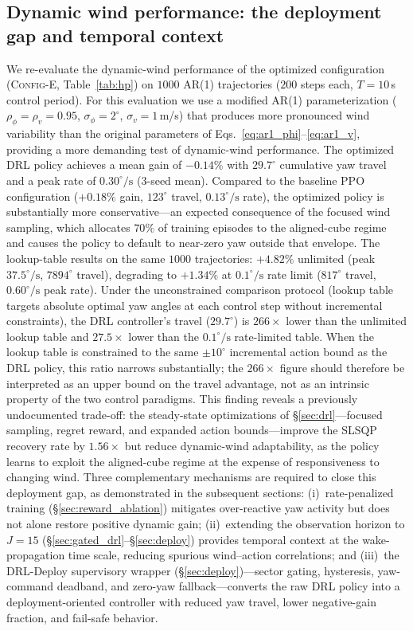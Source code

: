 \documentclass[final,5p,times]{elsarticle}
\begin{document}
\subsection{Dynamic wind performance: the deployment gap and temporal context}\label{sec:dynamic_wind}

We re-evaluate the dynamic-wind performance of the optimized configuration (\textsc{Config-E}, Table~\ref{tab:hp}) on $1000$ AR(1) trajectories ($200$ steps each, $T{=}10$\,s control period). For this evaluation we use a modified AR(1) parameterization ($\rho_\phi{=}\rho_v{=}0.95$, $\sigma_\phi{=}2^\circ$, $\sigma_v{=}1$\,m/s) that produces more pronounced wind variability than the original parameters of Eqs.~\eqref{eq:ar1_phi}--\eqref{eq:ar1_v}, providing a more demanding test of dynamic-wind performance. The optimized DRL policy achieves a mean gain of $-0.14\%$ with $29.7^\circ$ cumulative yaw travel and a peak rate of $0.30^\circ\!/\!\mathrm{s}$ (3-seed mean). Compared to the baseline PPO configuration ($+0.18\%$ gain, $123^\circ$ travel, $0.13^\circ\!/\!\mathrm{s}$ rate), the optimized policy is substantially more conservative---an expected consequence of the focused wind sampling, which allocates $70\%$ of training episodes to the aligned-cube regime and causes the policy to default to near-zero yaw outside that envelope. The lookup-table results on the same $1000$ trajectories: $+4.82\%$ unlimited (peak $37.5^\circ\!/\!\mathrm{s}$, $7894^\circ$ travel), degrading to $+1.34\%$ at $0.1^\circ\!/\!\mathrm{s}$ rate limit ($817^\circ$ travel, $0.60^\circ\!/\!\mathrm{s}$ peak rate). Under the unconstrained comparison protocol (lookup table targets absolute optimal yaw angles at each control step without incremental constraints), the DRL controller's travel ($29.7^\circ$) is $266{\times}$ lower than the unlimited lookup table and $27.5{\times}$ lower than the $0.1^\circ\!/\!\mathrm{s}$ rate-limited table. When the lookup table is constrained to the same $\pm10^\circ$ incremental action bound as the DRL policy, this ratio narrows substantially; the $266{\times}$ figure should therefore be interpreted as an upper bound on the travel advantage, not as an intrinsic property of the two control paradigms. This finding reveals a previously undocumented trade-off: the steady-state optimizations of \S\ref{sec:drl}---focused sampling, regret reward, and expanded action bounds---improve the SLSQP recovery rate by $1.56{\times}$ but reduce dynamic-wind adaptability, as the policy learns to exploit the aligned-cube regime at the expense of responsiveness to changing wind. Three complementary mechanisms are required to close this deployment gap, as demonstrated in the subsequent sections: (i)~rate-penalized training (\S\ref{sec:reward_ablation}) mitigates over-reactive yaw activity but does not alone restore positive dynamic gain; (ii)~extending the observation horizon to $J{=}15$ (\S\ref{sec:gated_drl}--\S\ref{sec:deploy}) provides temporal context at the wake-propagation time scale, reducing spurious wind--action correlations; and (iii)~the DRL-Deploy supervisory wrapper (\S\ref{sec:deploy})---sector gating, hysteresis, yaw-command deadband, and zero-yaw fallback---converts the raw DRL policy into a deployment-oriented controller with reduced yaw travel, lower negative-gain fraction, and fail-safe behavior.
\end{document}
